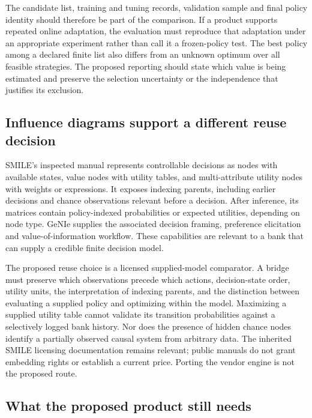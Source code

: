 The candidate list, training and tuning records, validation sample and final
policy identity should therefore be part of the comparison. If a product
supports repeated online adaptation, the evaluation must reproduce that
adaptation under an appropriate experiment rather than call it a frozen-policy
test. The best policy among a declared finite list also differs from an
unknown optimum over all feasible strategies. The proposed reporting should
state which value is being estimated and preserve the selection uncertainty
or the independence that justifies its exclusion. \citep{jiang2016,exec16_cp_matrix}

\subsection{Influence diagrams support a different reuse decision}

SMILE's inspected manual represents controllable decisions as nodes with
available states, value nodes with utility tables, and multi-attribute utility
nodes with weights or expressions. It exposes indexing parents, including
earlier decisions and chance observations relevant before a decision. After
inference, its matrices contain policy-indexed probabilities or expected
utilities, depending on node type. GeNIe supplies the associated decision
framing, preference elicitation and value-of-information workflow. These
capabilities are relevant to a bank that can supply a credible finite decision
model. \citep{exec16_cp_bayesfusion}

The proposed reuse choice is a licensed supplied-model comparator. A bridge
must preserve which observations precede which actions, decision-state order,
utility units, the interpretation of indexing parents, and the distinction
between evaluating a supplied policy and optimizing within the model.
Maximizing a supplied utility table cannot validate its transition probabilities
against a selectively logged bank history. Nor does the presence of hidden
chance nodes identify a partially observed causal system from arbitrary data.
The inherited SMILE licensing documentation remains relevant; public manuals
do not grant embedding rights or establish a current price. Porting the vendor
engine is not the proposed route. \citep{exec16_cp_bayesfusion,exec13_smile_license}

\subsection{What the proposed product still needs}


